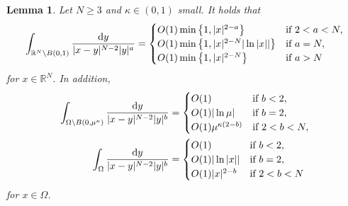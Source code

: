 \documentclass[reqno]{amsart}
\newtheorem{lemma}[theorem]{Lemma}
\theoremstyle{remark}
\newcommand{\R}{\mathbb{R}}
\newcommand{\dy}{\textup{d}y}
\renewcommand{\(}{\left(}
\renewcommand{\)}{\right)}
\numberwithin{equation}{section}
\begin{document}
\begin{lemma}
Let $N \ge 3$ and $\kappa \in (0,1)$ small. It holds that
\begin{equation}\label{basic est whole}
\int_{\R^N \setminus B(0,1)} \frac{\dy}{|x-y|^{N-2}|y|^a} =\begin{cases}
O(1)\min\left\{1,|x|^{2-a}\right\} &\textup{if } 2<a<N,\\
O(1)\min\left\{1,|x|^{2-N}|\ln |x||\right\} &\textup{if } a=N,\\
O(1)\min\left\{1,|x|^{2-N}\right\} &\textup{if } a>N
\end{cases}
\end{equation}
for $x \in \R^N$. In addition,
\begin{align}
\int_{\Omega \setminus B(0,\mu^\kappa)} \frac{\dy}{|x-y|^{N-2}|y|^b} &= \begin{cases}
O(1) &\textup{if } b<2,\\
O(1) |\ln\mu| &\textup{if } b=2,\\
O(1)\mu^{\kappa(2-b)} &\textup{if } 2<b<N,
\end{cases}\label{basic est}\\
\int_{\Omega} \frac{\dy}{|x-y|^{N-2}|y|^b} &= \begin{cases}
O(1) &\textup{if } b<2,\\
O(1) |\ln|x|| &\textup{if } b=2,\\
O(1)|x|^{2-b} &\textup{if } 2<b<N
\end{cases}\label{basic est o}
\end{align}
for $x \in \Omega$.
\end{lemma}
\end{document}
